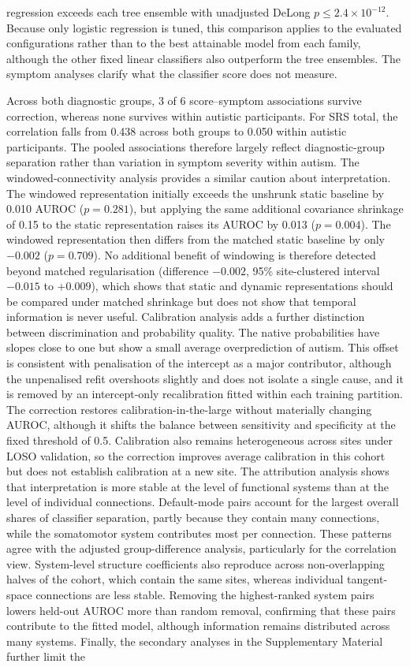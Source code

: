 regression exceeds each tree ensemble with unadjusted DeLong $p\le2.4\times10^{-12}$. Because only logistic regression is tuned, this comparison applies to the evaluated configurations rather than to the best attainable model from each family, although the other fixed linear classifiers also outperform the tree ensembles. The symptom analyses clarify what the classifier score does not measure. 

Across both diagnostic groups, 3 of 6 score--symptom associations survive correction, whereas none survives within autistic participants. For SRS total, the correlation falls from 0.438 across both groups to 0.050 within autistic participants. The pooled associations therefore largely reflect diagnostic-group separation rather than variation in symptom severity within autism. The windowed-connectivity analysis provides a similar caution about interpretation. The windowed representation initially exceeds the unshrunk static baseline by 0.010 AUROC ($p=0.281$), but applying the same additional covariance shrinkage of 0.15 to the static representation raises its AUROC by 0.013 ($p=0.004$). The windowed representation then differs from the matched static baseline by only $-0.002$ ($p=0.709$). No additional benefit of windowing is therefore detected beyond matched regularisation (difference $-0.002$, 95\% site-clustered interval $-0.015$ to $+0.009$), which shows that static and dynamic representations should be compared under matched shrinkage but does not show that temporal information is never useful. Calibration analysis adds a further distinction between discrimination and probability quality. The native probabilities have slopes close to one but show a small average overprediction of autism. This offset is consistent with penalisation of the intercept as a major contributor, although the unpenalised refit overshoots slightly and does not isolate a single cause, and it is removed by an intercept-only recalibration fitted within each training partition. The correction restores calibration-in-the-large without materially changing AUROC, although it shifts the balance between sensitivity and specificity at the fixed threshold of 0.5. Calibration also remains heterogeneous across sites under LOSO validation, so the correction improves average calibration in this cohort but does not establish calibration at a new site. The attribution analysis shows that interpretation is more stable at the level of functional systems than at the level of individual connections. Default-mode pairs account for the largest overall shares of classifier separation, partly because they contain many connections, while the somatomotor system contributes most per connection. These patterns agree with the adjusted group-difference analysis, particularly for the correlation view. System-level structure coefficients also reproduce across non-overlapping halves of the cohort, which contain the same sites, whereas individual tangent-space connections are less stable. Removing the highest-ranked system pairs lowers held-out AUROC more than random removal, confirming that these pairs contribute to the fitted model, although information remains distributed across many systems. Finally, the secondary analyses in the Supplementary Material further limit the 